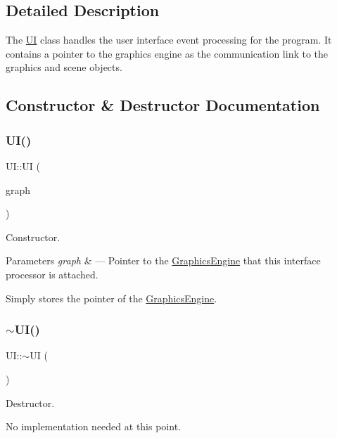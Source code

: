 \subsection{Detailed Description}
The \hyperlink{class_u_i}{UI} class handles the user interface event processing for the program. It contains a pointer to the graphics engine as the communication link to the graphics and scene objects. 

\subsection{Constructor \& Destructor Documentation}
\mbox{\label{class_u_i_a9c605272304cb2d5efff79edb32e9241}} 
\subsubsection{\texorpdfstring{U\+I()}{UI()}}
{\footnotesize\ttfamily U\+I\+::\+UI (\begin{DoxyParamCaption}\item[{\hyperlink{class_graphics_engine}{Graphics\+Engine} $\ast$}]{graph }\end{DoxyParamCaption})}



Constructor. 


\begin{DoxyParams}{Parameters}
{\em graph} & --- Pointer to the \hyperlink{class_graphics_engine}{Graphics\+Engine} that this interface processor is attached.\\
\hline
\end{DoxyParams}
Simply stores the pointer of the \hyperlink{class_graphics_engine}{Graphics\+Engine}. \mbox{\label{class_u_i_a1b23d0c64c7cbb3d143d90ec532a7ccd}} 
\subsubsection{\texorpdfstring{$\sim$\+U\+I()}{~UI()}}
{\footnotesize\ttfamily U\+I\+::$\sim$\+UI (\begin{DoxyParamCaption}{ }\end{DoxyParamCaption})}



Destructor. 

No implementation needed at this point. 

